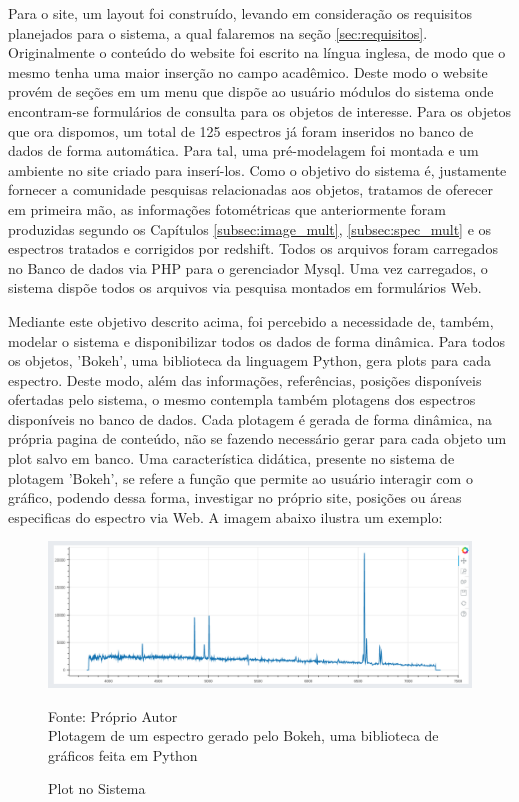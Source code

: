 Para o site, um layout foi construído, levando em consideração os requisitos planejados para o sistema, a qual falaremos na seção \ref{sec:requisitos}. Originalmente o conteúdo do website foi escrito na língua inglesa, de modo que o mesmo tenha uma maior inserção no campo acadêmico. Deste modo o website provém de seções em um menu que dispõe ao usuário módulos do sistema onde encontram-se formulários de consulta para os objetos de interesse.
Para os objetos que ora dispomos, um total de 125 espectros já foram inseridos no banco de dados de forma automática. Para tal, uma pré-modelagem foi montada e um ambiente no site criado para inserí-los.
Como o objetivo do sistema é, justamente fornecer a comunidade pesquisas relacionadas aos objetos, tratamos de oferecer em primeira mão, as informações fotométricas que anteriormente foram produzidas segundo os Capítulos \ref{subsec:image_mult}, \ref{subsec:spec_mult} e os espectros tratados e corrigidos por redshift. Todos os arquivos foram carregados no Banco de dados via PHP para o gerenciador Mysql. Uma vez carregados, o sistema dispõe todos os arquivos via pesquisa montados em formulários Web.

Mediante este objetivo descrito acima, foi percebido a necessidade de, também, modelar o sistema e  disponibilizar todos os dados de forma dinâmica. Para todos os objetos, 'Bokeh', uma biblioteca da linguagem Python, gera plots para cada espectro. Deste modo, além das informações, referências, posições disponíveis ofertadas pelo sistema, o mesmo contempla também plotagens dos espectros disponíveis no banco de dados. Cada plotagem é gerada de forma dinâmica, na própria pagina de conteúdo, não se fazendo necessário gerar para cada objeto um plot salvo em banco. Uma característica didática, presente no sistema de plotagem 'Bokeh', se refere a função que permite ao usuário interagir com o gráfico, podendo dessa forma, investigar no próprio site, posições ou áreas especificas do espectro via Web. A imagem abaixo ilustra um exemplo:

\begin{figure}[H]
	\centering	
    \caption{Plot no Sistema}
    \includegraphics[width=1.0\textwidth]{figuras/spec_plot.png}
   	\begin{center}
        \normalsize Fonte: Próprio Autor \\Plotagem de um espectro gerado pelo Bokeh, uma biblioteca de gráficos feita em Python
    \end{center}
	\label{fig:sbmt-moses}
\end{figure}

